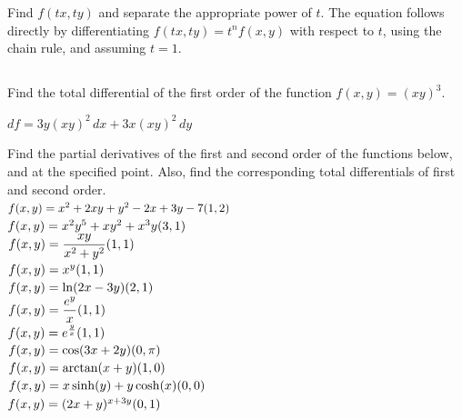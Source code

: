 \begin{Answer}
    
        \Question Find $f(tx,ty)$ and separate the appropriate power of $t$.
        \Question The equation follows directly by differentiating $f(tx,ty) = t^nf(x,y)$ with respect to $t$,  using the chain rule, and assuming $t=1$.
    
\end{Answer}
\fi

\subsection*{}
\ifcalculus
\begin{Exercise}[difficulty = 1] Find the total differential of the first order of the function $f(x,y)=(xy)^3.$
\end{Exercise}

\begin{Answer}
    $df = 3y(xy)^2\, dx + 3x(xy)^2\, dy$
\end{Answer}

\fi


\begin{Exercise} Find the partial derivatives of the first and second order of the functions below, and at the specified point. \label{part_afg_2_verand} 
Also, find the  corresponding total differentials of first and second order. 
	\Question[difficulty=1] $f(x,y) = x^2 + 2 xy + y^2 - 2 x + 3 y - 7 \hfill  (1,2) \hspace{7cm} $
	\Question[difficulty=1] $f(x,y) = x^2y^5 + xy^2 + x^3y \hfill (3,1) \hspace{7cm}  $
	\Question[difficulty=2] $f(x,y) = \dfrac{x y}{x^2 + y^2} \hfill (1,1)\hspace{7cm}  $
	\Question[difficulty=3] $f(x,y) = x^y \hfill (1,1) \hspace{7cm} $
	\Question[difficulty=2] $f(x,y) = \ln  ( 2x - 3y ) \hfill  (2,1) \hspace{7cm} $
	\ifanalysis\Question[difficulty=1]\fi\ifcalculus\Question[difficulty=2]\fi $f(x,y) = \dfrac{e^y}{x} \hfill   (1,1)\hspace{7cm}  $
	\ifanalysis\Question[difficulty=2]\fi\ifcalculus\Question[difficulty=3]\fi $f(x,y) = e^\frac{y}{x} \hfill (1,1) \hspace{7cm} $
	\Question[difficulty=2] $f(x,y) = \cos (3x+2y)\hfill (0,\pi)\hspace{7cm}  $
	\Question[difficulty=2] $f(x,y) = \arctan ( x + y )\hfill (1,0) \hspace{7cm}  $
	\ifanalysis 
	\Question[difficulty=2] $f(x,y) = x\sinh (y) + y\cosh (x) \hfill (0,0)\hspace{7cm}  $ 
	\fi
	\Question[difficulty=3] $f(x,y) = (2x+y)^{x+3y} \hfill  (0,1)\hspace{7cm}   $
\end{Exercise}

